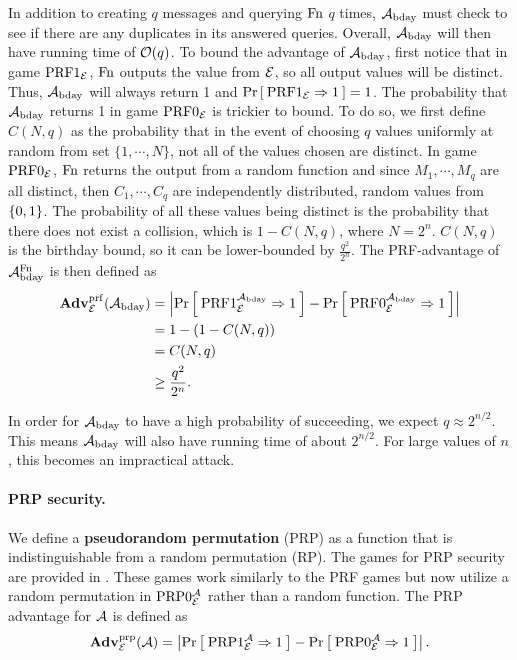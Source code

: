 In addition to creating $q$ messages and querying $\textnormal{Fn}$ $q$ times, ${\mathcal A}_{\text{bday}}$ must check to see if there are any duplicates in its answered queries. Overall, ${\mathcal A}_{\text{bday}}$ will then have running time of ${\cal O}(q)$.
To bound the advantage of ${\mathcal A}_{\text{bday}}$, first notice that in game $\textnormal{PRF}1_{{\cal E}}$, $\textnormal{Fn}$ outputs the value from ${\cal E}$, so all output values will be distinct. Thus, ${\mathcal A}_{\text{bday}}$ will always return 1 and $\Pr\left[\: \textnormal{PRF}1_{\cal E}\Rightarrow 1 \:\right]=1$. The probability that ${\mathcal A}_{\text{bday}}$ returns 1 in game $\textnormal{PRF}0_{{\cal E}}$ is trickier to bound. To do so, we first define $C(N,q)$ as the probability that in the event of choosing $q$ values uniformly at random from set $\{1,\cdots,N\}$, not all of the values chosen are distinct. In game $\textnormal{PRF}0_{{\cal E}}$, $\textnormal{Fn}$ returns the output from a random function and since $M_1, \cdots, M_q$ are all distinct, then $C_1, \cdots, C_q$ are independently distributed, random values from $\{0,1\}$. The probability of all these values being distinct is the probability that there does not exist a collision, which is $1-C(N,q)$, where $N=2^n$. $C(N,q)$ is the birthday bound, so it can be lower-bounded by $\frac{q^2}{2^n}$. 
The PRF-advantage of ${\mathcal A}^{\textnormal{Fn}}_{\text{bday}}$ is then defined as 
\begin{align*}
\mathbf{Adv}^{\mathrm{prf}}_{{\cal E}}({\mathcal A}_\text{bday}) &= \left| \Pr\left[\: \textnormal{PRF}1_{\cal E}^{{\mathcal A}_\text{bday}}\Rightarrow 1 \:\right] 
- \Pr\left[\: \textnormal{PRF}0_{\cal E}^{{\mathcal A}_\text{bday}}\Rightarrow1 \:\right] \right| \\
&= 1 - (1 - C(N,q)) \\ 
&= C(N,q) \\ 
&\geq \frac{q^2}{2^n}.
\end{align*}

In order for ${\mathcal A}_{\text{bday}}$ to have a high probability of succeeding, we expect $q \approx 2^{n/2}$. This means ${\mathcal A}_{\text{bday}}$ will also have running time of about $2^{n/2}$. For large values of $n$, this becomes an impractical attack. 


\paragraph{PRP security.} We define a \textbf{pseudorandom permutation} (PRP) as a function that is indistinguishable from a random permutation (RP). The games for PRP security are provided in . These games work similarly to the PRF games but now utilize a random permutation in $\textnormal{PRP}0_{\cal E}^{\mathcal A}$ rather than a random function. The PRP advantage for ${\mathcal A}$ is defined as 
\begin{equation*}
\mathbf{Adv}^{\mathrm{prp}}_{{\cal E}}({\mathcal A}) = \left| \Pr\left[\: \textnormal{PRP}1_{\cal E}^{\mathcal A}\Rightarrow 1 \:\right] 
- \Pr\left[\: \textnormal{PRP}0_{\cal E}^{\mathcal A}\Rightarrow1 \:\right] \right|.
\end{equation*}

